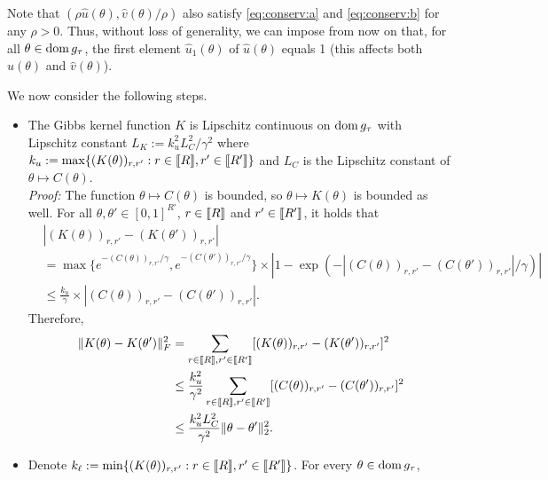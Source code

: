 Note that  $(\rho\widehat{u}(\theta), \widehat{v}(\theta)/\rho)$  also satisfy
\eqref{eq:conserv:a} and \eqref{eq:conserv:b} for any $\rho>0$.  Thus, without
loss   of  generality,   we   can   impose  from   now   on   that,  for   all
$\theta  \in \operatorname{dom}  g_{\tau}$, the  first element  $\widehat{u}_{1}(\theta)$ of
$\widehat{u}(\theta)$ equals  1 (this  affects both  $\widehat{u}(\theta)$ and
$\widehat{v}(\theta)$).

We now consider the following steps.
\begin{itemize}
\item The Gibbs kernel function $K$ is Lipschitz continuous on $\operatorname{dom} g_{\tau}$
  with   Lipschitz   constant   $L_{K}   :=   k^2_{u}L_{C}^2/\gamma^2$   where
  $k_u := \max\{(K(\theta))_{r,r'} : r\in\llbracket R\rrbracket, r'\in\llbracket R'\rrbracket\}$ and
  $L_{C}$   is   the   Lipschitz  constant   of   $\theta\mapsto   C(\theta)$.\\
  \textit{Proof:}  The  function  $\theta\mapsto  C(\theta)$  is  bounded,  so
  $\theta\mapsto    K(\theta)$    is    bounded     as    well.     For    all
  $\theta,\theta'\in[0,1]^{R'}$, $r \in \llbracket R \rrbracket$ and $r' \in \llbracket R' \rrbracket$, it
  holds that
  \begin{align*}
    & |(K(\theta))_{r,r'} - (K(\theta'))_{r,r'}|\\
    &            =           \max            \{e^{-(C(\theta))_{r,r'}/\gamma},
      e^{-(C(\theta'))_{r,r'}/\gamma}\}\times 
      |1 - \exp (-|(C(\theta))_{r,r'} - (C(\theta'))_{r,r'}|/\gamma)| \\ 
    &     \leq    \frac{k_{u}}{\gamma}     \times    |(C(\theta))_{r,r'}     -
      (C(\theta'))_{r,r'}|. 
  \end{align*}
  Therefore,
  \begin{align*}
    \|K(\theta) - K(\theta')\|_{F}^{2}
    &   =   \sum_{r\in\llbracket   R\rrbracket,  r'\in\llbracket   R'\rrbracket}   [(K(\theta))_{r,r'}   -
      (K(\theta'))_{r,r'}]^{2}\\ 
    & \leq \frac{k^2_{u}}{\gamma^2}\sum_{r\in\llbracket R\rrbracket, r'\in\llbracket R'\rrbracket} 
      [(C(\theta))_{r,r'} - (C(\theta'))_{r,r'}]^{2}\\
    & \leq \frac{k^2_{u}L_{C}^2}{\gamma^2} \| \theta - \theta' \|^2_2.
  \end{align*}
\item                                                                   Denote
  $k_{\ell} := \min\{(K(\theta))_{r,r'} : r\in\llbracket R\rrbracket, r'\in\llbracket R'\rrbracket\}$. For
  every $\theta \in \operatorname{dom} g_{\tau}$,
  \begin{align}
    \label{eq:bound:Lambda}

\end{align}
\end{itemize}

